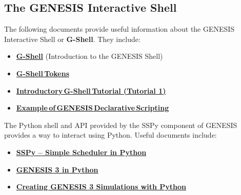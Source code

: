 \documentclass[12pt]{article}
\begin{document}
\subsection*{The GENESIS Interactive Shell}

The following documents provide useful information about the GENESIS Interactive Shell or {\bf G-Shell}. They include:

\begin{itemize}
\item \href{../gshell/gshell.tex}{\bf G-Shell} (Introduction to the GENESIS Shell)
\item \href{../shell-tokens/shell-tokens.tex}{\bf G-Shell\,Tokens}
\item \href{../tutorial1/tutorial1.tex}{\bf Introductory\,G-Shell\,Tutorial (Tutorial 1)}
\item \href{../example-script1/example-script1.tex}{\bf Example\,of\,GENESIS\,Declarative\,Scripting}
\end{itemize}

The Python shell and API provided by the SSPy component of GENESIS
provides a way to interact using Python.  Useful documents include:

\begin{itemize}
\item \href{../SSPy/SSPy.tex}{\bf SSPy -- Simple Scheduler in Python}
\item \href{../g3-python/g3-python.tex}{\bf GENESIS 3 in Python}
\item \href{..tutorial-python-scripting/tutorial-python-scripting.html}{\bf
       Creating GENESIS 3 Simulations with Python}
\end{itemize}
\end{document}
